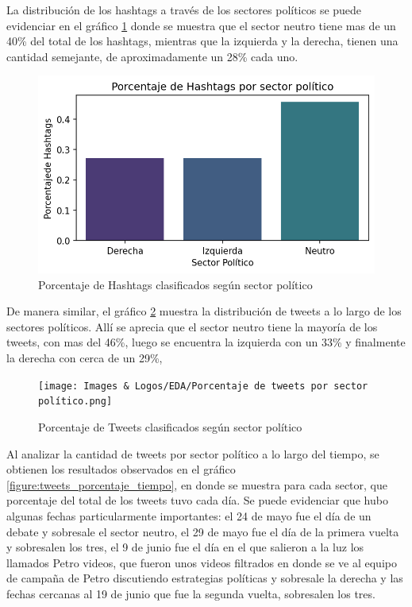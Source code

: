 
 

La distribución de los hashtags a través de los sectores políticos se puede evidenciar en el gráfico \ref{figure:tweets_cantidad_hashtags} donde se muestra que el sector neutro tiene mas de un  40\% del total de los hashtags, mientras que la izquierda y la derecha, tienen una cantidad semejante, de aproximadamente un 28\% cada uno.


\begin{figure}[t]
	\centering
	\includegraphics{Images & Logos/EDA/Cantidad de Hashtags por sector politico.png} 
	\caption{Porcentaje de Hashtags clasificados según sector político}
	\label{figure:tweets_cantidad_hashtags}
\end{figure}

De manera similar, el gráfico \ref{figure:tweets_porcentaje} muestra la distribución de tweets a lo largo de los sectores políticos. Allí se aprecia que el sector neutro tiene la mayoría de los tweets, con mas del 46\%, luego se encuentra la izquierda con un 33\% y finalmente la derecha con cerca de un 29\%,



\begin{figure}[t]
	\centering
	\texttt{[image: Images \& Logos/EDA/Porcentaje de tweets por sector político.png]} 
	\caption{Porcentaje de Tweets clasificados según sector político}
	\label{figure:tweets_porcentaje}
\end{figure}


Al analizar la cantidad de tweets por sector político a lo largo del tiempo, se obtienen los resultados observados en el gráfico \ref{figure:tweets_porcentaje_tiempo}, en donde se muestra para cada  sector, que porcentaje del total de los tweets tuvo cada día. Se puede evidenciar que hubo algunas fechas particularmente importantes: el 24 de mayo fue el día de un debate y sobresale el sector neutro, el 29 de mayo fue el día de la primera vuelta y sobresalen los tres, el 9 de junio fue el día en el que salieron a la luz los llamados Petro videos, que fueron unos videos filtrados en donde se ve al equipo de campaña de Petro discutiendo estrategias políticas y sobresale la derecha y las fechas cercanas al 19 de junio que fue la segunda vuelta, sobresalen los tres.




